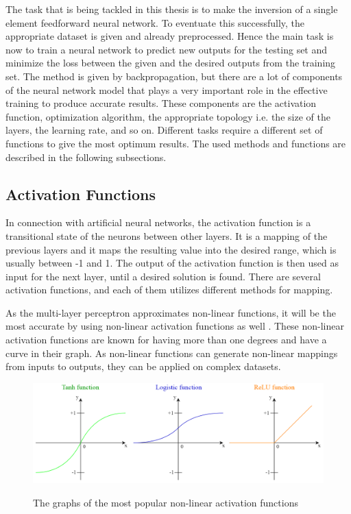 The task that is being tackled in this thesis is to make the inversion of a single element feedforward neural network. To eventuate this successfully, the appropriate dataset is given and already preprocessed. Hence the main task is now to train a neural network to predict new outputs for the testing set and minimize the loss between the given and the desired outputs from the training set. The method is given by backpropagation, but there are a lot of components of the neural network model that plays a very important role in the effective training to produce accurate results. These components are the activation function, optimization algorithm, the appropriate topology i.e. the size of the layers, the learning rate, and so on. Different tasks require a different set of functions to give the most optimum results. The used methods and functions are described in the following subsections.


\subsection{Activation Functions}

In connection with artificial neural networks, the activation function is a transitional state of the neurons between other layers. It is a mapping of the previous layers and it maps the resulting value into the desired range, which is usually between -1 and 1. The output of the activation function is then used as input for the next layer, until a desired solution is found. There are several activation functions, and each of them utilizes different methods for mapping. \medskip

As the multi-layer perceptron approximates non-linear functions, it will be the most accurate by using non-linear activation functions as well \cite{pillo2013nonlinear}. These non-linear activation functions are known for having more than one degrees and have a curve in their graph. As non-linear functions can generate non-linear mappings from inputs to outputs, they can be applied on complex datasets. 

\begin{figure}[h]
	\centering
	\caption{The graphs of the most popular non-linear activation functions}
	\includegraphics[height=0.35\linewidth]{./figures/functions}
	\label{fig:functions}
\end{figure}

